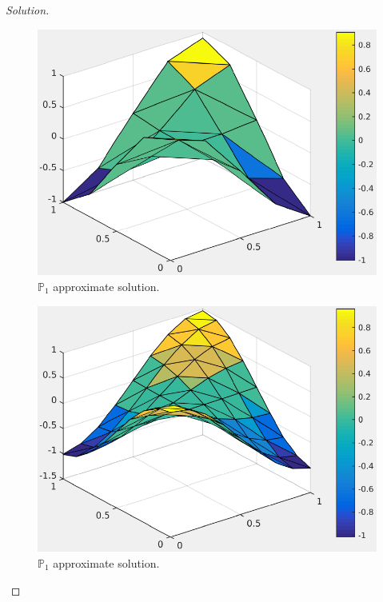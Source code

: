 \documentclass[11pt,a4paper,center,notitlepage]{article}
\numberwithin{equation}{section}
\begin{document}
\begin{proof}[Solution]
\begin{figure}[H]
\centering
\includegraphics[scale=0.9]{appro_solution_2_P1}
\caption{$\mathbb{P}_1$ approximate solution.}
\end{figure} 

\begin{figure}[H]
\centering
\includegraphics[scale=0.9]{appro_solution_3_P1}
\caption{$\mathbb{P}_1$ approximate solution.}
\end{figure} 


\end{proof}
\end{document}
